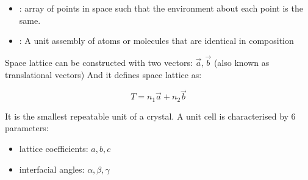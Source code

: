 \documentclass[12pt, a4paper]{article}
\begin{document}

\begin{itemize}
	\item {}: array of points in space such that the environment about each point is the same.
	\item {}: A unit assembly of atoms or molecules that are identical in composition
\end{itemize}

Space lattice can be constructed with two vectors: $\vec{a}, \vec{b}$ (also known as translational vectors)
And it defines space lattice as:

$$
	T=n_1 \vec{a}+n_2 \vec{b}
$$




\begin{minipage}[t][][b]{.6\textwidth}
	It is the smallest repeatable unit of a crystal. A unit cell is characterised by 6 parameters:
	\begin{itemize}
		\item lattice coefficients: $a, b, c$
		\item interfacial angles: $\alpha, \beta, \gamma$
	\end{itemize}
\end{minipage}
\hfill
\begin{minipage}[t][][b]{.35\textwidth}
\end{minipage}





\end{document}

